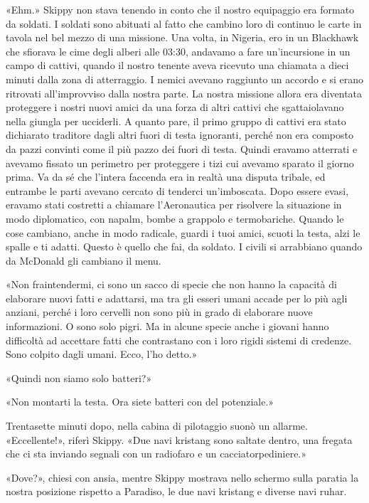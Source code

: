 «Ehm.» Skippy non stava tenendo in conto che il nostro equipaggio era
formato da soldati. I soldati sono abituati al fatto che cambino loro di
continuo le carte in tavola nel bel mezzo di una missione. Una volta, in
Nigeria, ero in un Blackhawk che sfiorava le cime degli alberi alle
03:30, andavamo a fare un'incursione in un campo di cattivi, quando il
nostro tenente aveva ricevuto una chiamata a dieci minuti dalla zona di
atterraggio. I nemici avevano raggiunto un accordo e si erano ritrovati
all'improvviso dalla nostra parte. La nostra missione allora era
diventata proteggere i nostri nuovi amici da una forza di altri cattivi
che sgattaiolavano nella giungla per ucciderli. A quanto pare, il primo
gruppo di cattivi era stato dichiarato traditore dagli altri fuori di
testa ignoranti, perché non era composto da pazzi convinti come il più
pazzo dei fuori di testa. Quindi eravamo atterrati e avevamo fissato un
perimetro per proteggere i tizi cui avevamo sparato il giorno prima. Va
da sé che l'intera faccenda era in realtà una disputa tribale, ed
entrambe le parti avevano cercato di tenderci un'imboscata. Dopo essere
evasi, eravamo stati costretti a chiamare l'Aeronautica per risolvere la
situazione in modo diplomatico, con napalm, bombe a grappolo e
termobariche. Quando le cose cambiano, anche in modo radicale, guardi i
tuoi amici, scuoti la testa, alzi le spalle e ti adatti. Questo è quello
che fai, da soldato. I civili si arrabbiano quando da McDonald gli
cambiano il menu.

«Non fraintendermi, ci sono un sacco di specie che non hanno la capacità
di elaborare nuovi fatti e adattarsi, ma tra gli esseri umani accade per
lo più agli anziani, perché i loro cervelli non sono più in grado di
elaborare nuove informazioni. O sono solo pigri. Ma in alcune specie
anche i giovani hanno difficoltà ad accettare fatti che contrastano con
i loro rigidi sistemi di credenze. Sono colpito dagli umani. Ecco, l'ho
detto.»

«Quindi non siamo solo batteri?»

«Non montarti la testa. Ora siete batteri con del potenziale.»

\hfill\break

Trentasette minuti dopo, nella cabina di pilotaggio suonò un allarme.
«Eccellente!», riferì Skippy. «Due navi kristang sono saltate dentro,
una fregata che ci sta inviando segnali con un radiofaro e un
cacciatorpediniere.»

«Dove?», chiesi con ansia, mentre Skippy mostrava nello schermo sulla
paratia la nostra posizione rispetto a Paradiso, le due navi kristang e
diverse navi ruhar.

